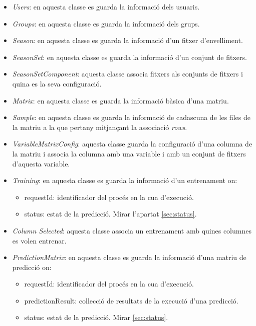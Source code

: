 \begin{itemize}
\item \textit{Users}: en aquesta classe es guarda la informaci\'{o} dels usuaris.

\item \textit{Groups}: en aquesta classe es guarda la informaci\'{o} dels grups. 

\item \textit{Season}: en aquesta classe es guarda la informaci\'{o} d'un fitxer d'envelliment.

\item \textit{SeasonSet}: en aquesta classe es guarda la informaci\'{o} d'un conjunt de fitxers.

\item \textit{SeasonSetComponent}: aquesta classe associa fitxers als conjunts de fitxers i quina es la seva configuració.

\item \textit{Matrix}: en aquesta classe es guarda la informaci\'{o} b\`{a}sica d'una matriu.

\item \textit{Sample}: en aquesta classe es guarda la informaci\'{o} de cadascuna de les files de la matriu a la que pertany mitjançant la associaci\'{o} \textit{rows}.

\item \textit{VariableMatrixConfig}: aquesta classe guarda la configuraci\'{o} d'una columna de la matriu i associa la columna amb una variable i amb un conjunt de fitxers d'aquesta variable.

\item \textit{Training}: en aquesta classe es guarda la informaci\'{o} d'un entrenament on:
\begin{itemize}
\item requestId: identificador del proc\'{e}s en la cua d'execuci\'{o}.
\item status: estat de la predicci\'{o}. Mirar l'apartat \ref{sec:status}.
\end{itemize}

\item \textit{Column Selected}: aquesta classe associa un entrenament amb quines columnes es volen entrenar.

\item \textit{PredictionMatrix}: en aquesta classe es guarda la informaci\'{o} d'una matriu de predicci\'{o} on:
\begin{itemize}
\item requestId: identificador del proc\'{e}s en la cua d'execuci\'{o}.
\item predictionResult: collecci\'{o} de resultats de la execuci\'{o} d'una predicci\'{o}.
\item status: estat de la predicci\'{o}. Mirar \ref{sec:status}.
\end{itemize}


\end{itemize}
